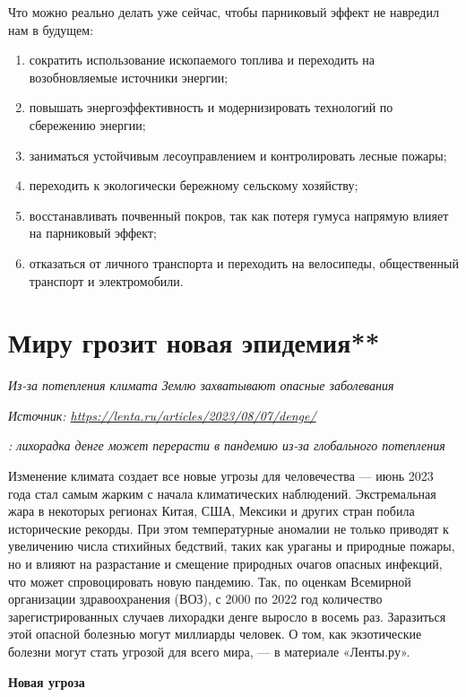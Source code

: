 Что можно реально делать уже сейчас, чтобы парниковый эффект не навредил нам в будущем:
\begin{enumerate}
    \item сократить использование ископаемого топлива и переходить на возобновляемые источники энергии;
    \item повышать энергоэффективность и модернизировать технологий по сбережению энергии;
    \item заниматься устойчивым лесоуправлением и контролировать лесные пожары;
    \item переходить к экологически бережному сельскому хозяйству;
    \item восстанавливать почвенный покров, так как потеря гумуса напрямую влияет на парниковый эффект;
    \item отказаться от личного транспорта и переходить на велосипеды, общественный транспорт и электромобили.
\end{enumerate}



\newpage
\section{Миру грозит новая эпидемия**}

\textit{Из-за потепления климата Землю захватывают опасные заболевания}

\textit{Источник: \url{https://lenta.ru/articles/2023/08/07/denge/}}

\textit{: лихорадка денге может перерасти в пандемию из-за глобального потепления}

Изменение климата создает все новые угрозы для человечества --- июнь 2023 года стал самым жарким с начала климатических наблюдений. Экстремальная жара в некоторых регионах Китая, США, Мексики и других стран побила исторические рекорды. При этом температурные аномалии не только приводят к увеличению числа стихийных бедствий, таких как ураганы и природные пожары, но и влияют на разрастание и смещение природных очагов опасных инфекций, что может спровоцировать новую пандемию. Так, по оценкам Всемирной организации здравоохранения (ВОЗ), с 2000 по 2022 год количество зарегистрированных случаев лихорадки денге выросло в восемь раз. Заразиться этой опасной болезнью могут миллиарды человек. О том, как экзотические болезни могут стать угрозой для всего мира, --- в материале «Ленты.ру».

\textbf{Новая угроза}

